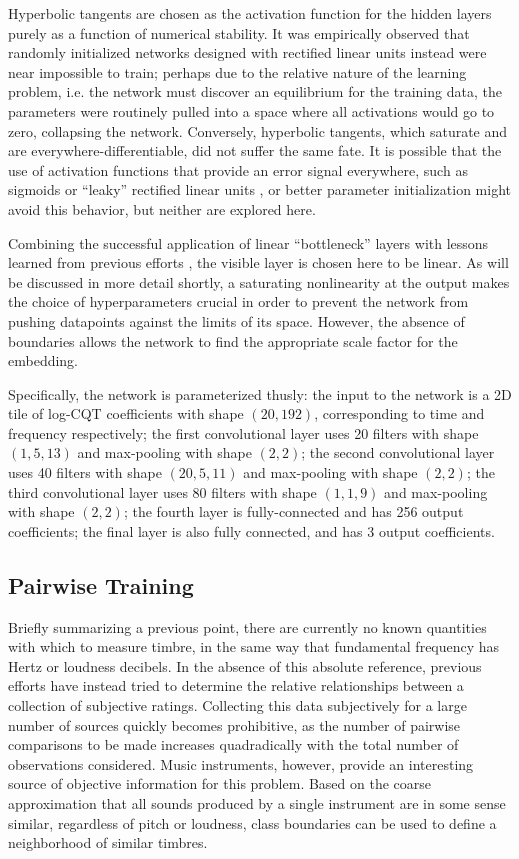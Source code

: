 Hyperbolic tangents are chosen as the activation function for the hidden layers purely as a function of numerical stability.
It was empirically observed that randomly initialized networks designed with rectified linear units instead were near impossible to train; perhaps due to the relative nature of the learning problem, i.e. the network must discover an equilibrium for the training data, the parameters were routinely pulled into a space where all activations would go to zero, collapsing the network.
Conversely, hyperbolic tangents, which saturate and are everywhere-differentiable, did not suffer the same fate.
It is possible that the use of activation functions that provide an error signal everywhere, such as sigmoids or ``leaky'' rectified linear units \cite{Maas2014}, or better parameter initialization might avoid this behavior, but neither are explored here.

Combining the successful application of linear ``bottleneck'' layers \cite{Liao2013} with lessons learned from previous efforts \cite{Humphrey2011}, the visible layer is chosen here to be linear.
As will be discussed in more detail shortly, a saturating nonlinearity at the output makes the choice of hyperparameters crucial in order to prevent the network from pushing datapoints against the limits of its space.
However, the absence of boundaries allows the network to find the appropriate scale factor for the embedding.

Specifically, the network is parameterized thusly: the input to the network is a
2D tile of log-CQT coefficients with shape $(20, 192)$, corresponding to time
and frequency respectively; the first convolutional layer uses 20 filters with
shape $(1, 5, 13)$ and max-pooling with shape $(2, 2)$; the second convolutional
layer uses 40 filters with shape $(20, 5, 11)$ and max-pooling with shape $(2,
2)$; the third convolutional layer uses 80 filters with shape $(1, 1, 9)$ and
max-pooling with shape $(2, 2)$; the fourth layer is fully-connected and has 256
output coefficients; the final layer is also fully connected, and has 3 output coefficients.


\subsection{Pairwise Training}
\label{subsec:timbre_pairwise}

Briefly summarizing a previous point, there are currently no known quantities with which to measure timbre, in the same way that fundamental frequency has Hertz or loudness decibels.
In the absence of this absolute reference, previous efforts have instead tried to determine the relative relationships between a collection of subjective ratings.
Collecting this data subjectively for a large number of sources quickly becomes prohibitive, as the number of pairwise comparisons to be made increases quadradically with the total number of observations considered.
Music instruments, however, provide an interesting source of objective information for this problem.
Based on the coarse approximation that all sounds produced by a single instrument are in some sense similar, regardless of pitch or loudness, class boundaries can be used to define a neighborhood of similar timbres.


